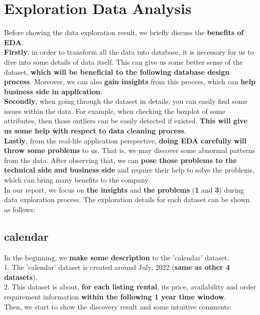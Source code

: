 \documentclass{article}
\begin{document}
	\section{Exploration Data Analysis}
	Before showing the data exploration result, we briefly discuss the \textbf{benefits of EDA}. 
	\vspace{3pt}
	\\
	\textbf{Firstly}, in order to transform all the data into database, it is necessary for us to dive into some details of data itself. This can give us some better sense of the dataset, \textbf{which will be beneficial to the following database design process}. Moreover, we can also \textbf{gain insights} from this process, which can \textbf{help business side in application}.
	\vspace{3pt}
	\\
	\textbf{Secondly}, when going through the dataset in details, you can easily find some issues within the data. For example, when checking the boxplot of some attributes, then those outliers can be easily detected if existed. \textbf{This will give us some help with respect to data cleaning process}.
	\vspace{3pt}
	\\
	\textbf{Lastly}, from the real-life application perspective, \textbf{doing EDA carefully will throw some problems} to us. That is, we may discover some abnormal patterns from the data. After observing that, we can \textbf{pose those problems to the technical side and business side} and require their help to solve the problems, which can bring many benefits to the company.
	\vspace{3pt}
	\\
	In our report, we focus on \textbf{the insights} and \textbf{the problems} (\textbf{1} and \textbf{3}) during data exploration process. The exploration details for each dataset can be shown as follows:
	\subsection{calendar}
	In the beginning, we \textbf{make some description} to the 'calendar' dataset. 
	\vspace{3pt}
	\\
	1. The 'calendar' dataset is created around July, 2022 (\textbf{same as other 4 datasets}). 
	\\
	2. This dataset is about, \textbf{for each listing rental}, its price, availability and order requirement information \textbf{within the following 1 year time window}.
	\vspace{3pt}
	\\
	Then, we start to show the discovery result and some intuitive comments:
\end{document}
